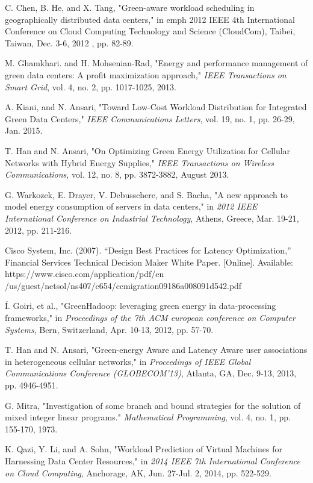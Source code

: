 \documentclass[journal,12pt,draftclsnofoot,onecolumn]{IEEEtran}
\begin{document}
\begin{titlepage}
\begin{center}
\begin{thebibliography}{15}
C. Chen, B. He, and X. Tang, "Green-aware workload scheduling in geographically distributed data centers," in emph{ 2012 IEEE 4th International Conference on Cloud Computing Technology and Science (CloudCom)}, Taibei, Taiwan, Dec. 3-6, 2012 , pp. 82-89.

M. Ghamkhari. and H. Mohsenian-Rad, "Energy and performance management of green data centers: A profit maximization approach," \emph{IEEE Transactions on Smart Grid}, vol. 4, no. 2, pp. 1017-1025, 2013. 

A. Kiani, and N. Ansari, "Toward Low-Cost Workload Distribution for Integrated Green Data Centers," \emph{IEEE Communications Letters}, vol. 19, no. 1, pp. 26-29, Jan. 2015.

T. Han and N. Ansari, "On Optimizing Green Energy Utilization for Cellular Networks with Hybrid Energy Supplies," \emph{IEEE Transactions on Wireless Communications}, vol. 12, no. 8, pp. 3872-3882, August 2013.

G. Warkozek, E. Drayer, V. Debusschere, and S. Bacha, "A new approach to model energy consumption of servers in data centers," in \emph{2012 IEEE International Conference on Industrial Technology}, Athens, Greece, Mar. 19-21, 2012, pp. 211-216.

Cisco System, Inc. (2007). “Design Best Practices for Latency Optimization,” Financial Services Technical Decision Maker White Paper. [Online]. Available: https://www.cisco.com/application/pdf/en /us/guest/netsol/ns407/c654/ccmigration09186a008091d542.pdf

Í. Goiri, et al., "GreenHadoop: leveraging green energy in data-processing frameworks," in \emph{Proceedings of the 7th ACM european conference on Computer Systems}, Bern, Switzerland, Apr. 10-13, 2012, pp. 57-70.

T. Han and N. Ansari, "Green-energy Aware and Latency Aware user associations in heterogeneous cellular networks," in \emph{Proceedings of IEEE Global Communications Conference (GLOBECOM'13)}, Atlanta, GA, Dec. 9-13, 2013, pp. 4946-4951.

G. Mitra, "Investigation of some branch and bound strategies for the solution of mixed integer linear programs." \emph{Mathematical Programming}, vol. 4, no. 1, pp. 155-170, 1973.

K. Qazi, Y. Li, and A. Sohn, "Workload Prediction of Virtual Machines for Harnessing Data Center Resources," in \emph{2014 IEEE 7th International Conference on Cloud Computing}, Anchorage, AK, Jun. 27-Jul. 2, 2014, pp. 522-529.


\end{thebibliography}
\end{center}
\end{titlepage}
\end{document}
